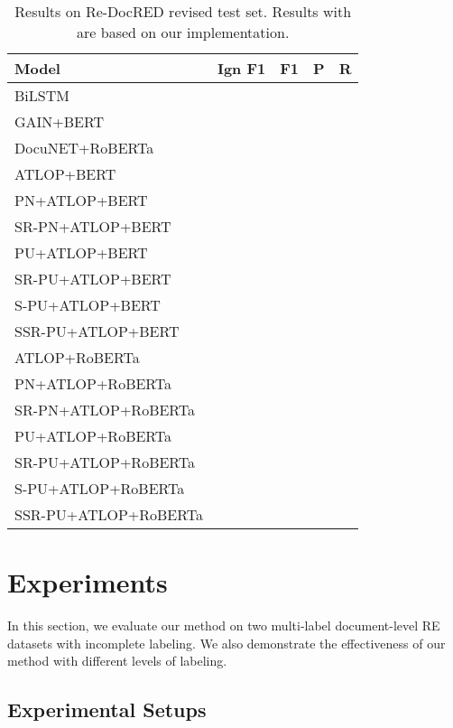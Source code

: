 \documentclass[11pt]{article}
\begin{document}
\begin{table*}
\centering
\begin{tabular}{lcccc}
\hline \textbf{Model} & \textbf{Ign F1} & \textbf{F1} & \textbf{P} & \textbf{R} \\
\hline BiLSTM &  &  &  &  \\
GAIN+BERT &  &  &  &  \\
DocuNET+RoBERTa &  &  &  &  \\
\hline
\hline ATLOP+BERT &  &  &  &  \\
PN+ATLOP+BERT &  &  &  &  \\
SR-PN+ATLOP+BERT &  &  &  &  \\
PU+ATLOP+BERT &  &  &  &  \\
SR-PU+ATLOP+BERT &  &  &  &  \\
S-PU+ATLOP+BERT &  &  &  &  \\
SSR-PU+ATLOP+BERT &  &  &  &  \\
\hline ATLOP+RoBERTa &  &  &  &  \\
PN+ATLOP+RoBERTa &  &  &  &  \\
SR-PN+ATLOP+RoBERTa &  &  &  &  \\
PU+ATLOP+RoBERTa &  &  &  &  \\
SR-PU+ATLOP+RoBERTa &  &  &  &  \\
S-PU+ATLOP+RoBERTa &  &  &  &  \\
SSR-PU+ATLOP+RoBERTa &  &  &  &  \\
\hline
\end{tabular}
\caption{\label{table1}
Results on Re-DocRED revised test set. Results with  are based on our implementation.
}
\end{table*}

\section{Experiments}
In this section, we evaluate our method on two multi-label document-level RE datasets with incomplete labeling. We also demonstrate the effectiveness of our method with different levels of labeling.

\subsection{Experimental Setups}
\end{document}
